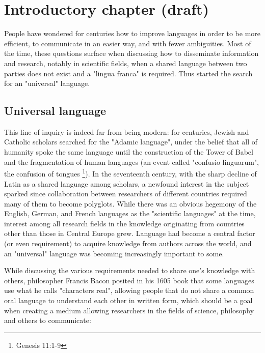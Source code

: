 \chapter{Introductory chapter (draft)}

\vspace{0.5cm}

People have wondered for centuries how to improve languages in order to be more efficient, to communicate in an easier way, and with fewer ambiguities.
Most of the time, these questions surface when discussing how to disseminate information and research, notably in scientific fields, when a shared language
between two parties does not exist and a "lingua franca" is required. Thus started the search for an "universal" language.

\section{Universal language}

This line of inquiry is indeed far from being modern: for centuries, Jewish and Catholic scholars searched for the "Adamic language", under the belief that
all of humanity spoke the same language until the construction of the Tower of Babel and the fragmentation of human languages (an event called "confusio linguarum",
the confusion of tongues \footnote{Genesis 11:1-9}). In the seventeenth century, with the sharp decline of Latin as a shared language among scholars, a newfound interest in
the subject sparked since collaboration between researchers of different countries required many of them to become polyglots. While there was an obvious hegemony of the English,
German, and French languages as the "scientific languages" at the time, interest among all research fields in the knowledge originating from countries other than those in Central Europe grew.
Language had become a central factor (or even requirement) to acquire knowledge from authors across the world, and an "universal" language was becoming increasingly important to some.\newline

While discussing the various requirements needed to share one's knowledge with others, philosopher Francis Bacon posited in his 1605 book that some languages use what
he calls "characters real", allowing people that do not share a common oral language to understand each other in written form, which should be a goal when creating a
medium allowing researchers in the fields of science, philosophy and others to communicate:

